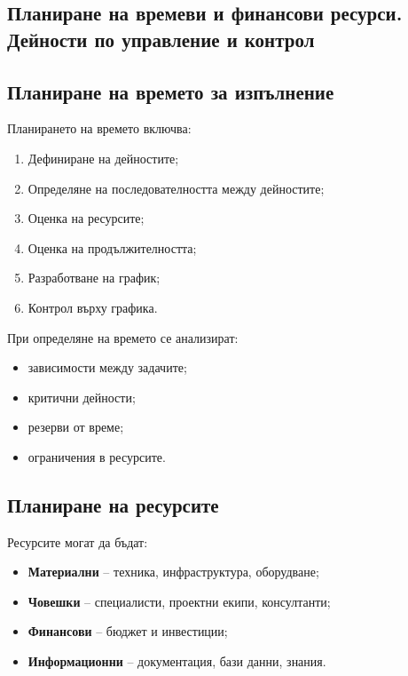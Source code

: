 \documentclass{scrartcl}
\begin{document}
\begin{FlushLeft}
\section{Планиране на времеви и финансови ресурси. Дейности по управление и контрол}

\subsection{Планиране на времето за изпълнение}

Планирането на времето включва:

\begin{enumerate}
    \item Дефиниране на дейностите;
    \item Определяне на последователността между дейностите;
    \item Оценка на ресурсите;
    \item Оценка на продължителността;
    \item Разработване на график;
    \item Контрол върху графика.
\end{enumerate}

При определяне на времето се анализират:

\begin{itemize}
    \item зависимости между задачите;
    \item критични дейности;
    \item резерви от време;
    \item ограничения в ресурсите.
\end{itemize}

\subsection{Планиране на ресурсите}

Ресурсите могат да бъдат:

\begin{itemize}
    \item \textbf{Материални} – техника, инфраструктура, оборудване;
    \item \textbf{Човешки} – специалисти, проектни екипи, консултанти;
    \item \textbf{Финансови} – бюджет и инвестиции;
    \item \textbf{Информационни} – документация, бази данни, знания.
\end{itemize}


\end{FlushLeft}
\end{document}
